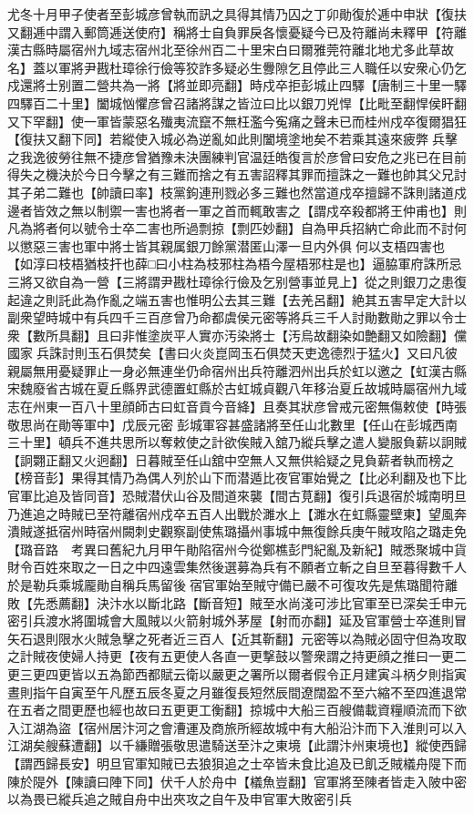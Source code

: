 尤冬十月甲子使者至彭城彦曾執而訊之具得其情乃囚之丁卯勛復於逓中申狀【復扶又翻逓中謂入郵筒逓送使府】稱將士自負罪戾各懷憂疑今已及符離尚未釋甲【符離漢古縣時屬宿州九域志宿州北至徐州百二十里宋白曰爾雅莞符離北地尤多此草故名】蓋以軍將尹戡杜璋徐行儉等狡詐多疑必生釁隙乞且停此三人職任以安衆心仍乞戍還將士别置二營共為一將【將並即亮翻】時戍卒拒彭城止四驛【唐制三十里一驛四驛百二十里】闔城忷懼彦曾召諸將謀之皆泣曰比以銀刀兇悍【比毗至翻悍侯盰翻又下罕翻】使一軍皆蒙惡名殱夷流竄不無枉濫今寃痛之聲未已而桂州戍卒復爾猖狂【復扶又翻下同】若縱使入城必為逆亂如此則闔境塗地矣不若乘其遠來疲弊兵擊之我逸彼勞往無不捷彦曾猶豫未決團練判官温廷皓復言於彦曾曰安危之兆已在目前得失之機決於今日今擊之有三難而捨之有五害詔釋其罪而擅誅之一難也帥其父兄討其子弟二難也【帥讀曰率】枝黨鉤連刑戮必多三難也然當道戍卒擅歸不誅則諸道戍邊者皆效之無以制禦一害也將者一軍之首而輒敢害之【謂戍卒殺都將王仲甫也】則凡為將者何以號令士卒二害也所過剽掠【剽匹妙翻】自為甲兵招納亡命此而不討何以懲惡三害也軍中將士皆其親属銀刀餘黨潜匿山澤一旦内外俱何以支梧四害也【如淳曰枝梧猶枝扞也薛□曰小柱為枝邪柱為梧今屋梧邪柱是也】逼脇軍府誅所忌三將又欲自為一營【三將謂尹戡杜璋徐行儉及乞别營事並見上】從之則銀刀之患復起違之則託此為作亂之端五害也惟明公去其三難【去羌呂翻】絶其五害早定大計以副衆望時城中有兵四千三百彦曾乃命都虞侯元密等將兵三千人討勛數勛之罪以令士衆【數所具翻】且曰非惟塗炭平人實亦汚染將士【汚烏故翻染如艶翻又如險翻】儻國家兵誅討則玉石俱焚矣【書曰火炎崑岡玉石俱焚天吏逸德烈于猛火】又曰凡彼親屬無用憂疑罪止一身必無連坐仍命宿州出兵符離泗州出兵於虹以邀之【虹漢古縣宋魏廢省古城在夏丘縣界武德置虹縣於古虹城貞觀八年移治夏丘故城時屬宿州九域志在州東一百八十里顔師古曰虹音貢今音絳】且奏其狀彦曾戒元密無傷敕使【時張敬思尚在勛等軍中】戊辰元密彭城軍容甚盛諸將至任山北數里【任山在彭城西南三十里】頓兵不進共思所以奪敕使之計欲俟賊入舘乃縱兵擊之遣人變服負薪以詗賊【詗翾正翻又火迥翻】日暮賊至任山舘中空無人又無供給疑之見負薪者執而榜之【榜音彭】果得其情乃為偶人列於山下而潜遁比夜官軍始覺之【比必利翻及也下比官軍比追及皆同音】恐賊潜伏山谷及間道來襲【間古莧翻】復引兵退宿於城南明旦乃進追之時賊已至符離宿州戍卒五百人出戰於濉水上【濉水在虹縣靈壁東】望風奔潰賊遂抵宿州時宿州闕刺史觀察副使焦璐攝州事城中無復餘兵庚午賊攻陷之璐走免【璐音路　考異曰舊紀九月甲午勛陷宿州今從鄭樵彭門紀亂及新紀】賊悉聚城中貨財令百姓來取之一日之中四遠雲集然後選募為兵有不願者立斬之自旦至暮得數千人於是勒兵乘城龎勛自稱兵馬留後宿官軍始至賊守備已嚴不可復攻先是焦璐聞符離敗【先悉薦翻】決汴水以斷北路【斷音短】賊至水尚淺可涉比官軍至已深矣壬申元密引兵渡水將圍城會大風賊以火箭射城外茅屋【射而亦翻】延及官軍營士卒進則冒矢石退則限水火賊急擊之死者近三百人【近其靳翻】元密等以為賊必固守但為攻取之計賊夜使婦人持更【夜有五更使人各直一更撃鼓以警衆謂之持更顔之推曰一更二更三更四更皆以五為節西都賦云衛以嚴更之署所以爾者假令正月建寅斗柄夕則指寅晝則指午自寅至午凡歷五辰冬夏之月雖復長短然辰間遼闊盈不至六縮不至四進退常在五者之間更歷也經也故曰五更更工衡翻】掠城中大船三百艘備載資糧順流而下欲入江湖為盜【宿州居汴河之會漕運及商旅所經故城中有大船沿汴而下入淮則可以入江湖矣艘蘇遭翻】以千縑贈張敬思遣騎送至汴之東境【此謂汴州東境也】縱使西歸【謂西歸長安】明旦官軍知賊已去狼狽追之士卒皆未食比追及已飢乏賊檥舟隄下而陳於隄外【陳讀曰陣下同】伏千人於舟中【檥魚豈翻】官軍將至陳者皆走入陂中密以為畏已縱兵追之賊自舟中出夾攻之自午及申官軍大敗密引兵